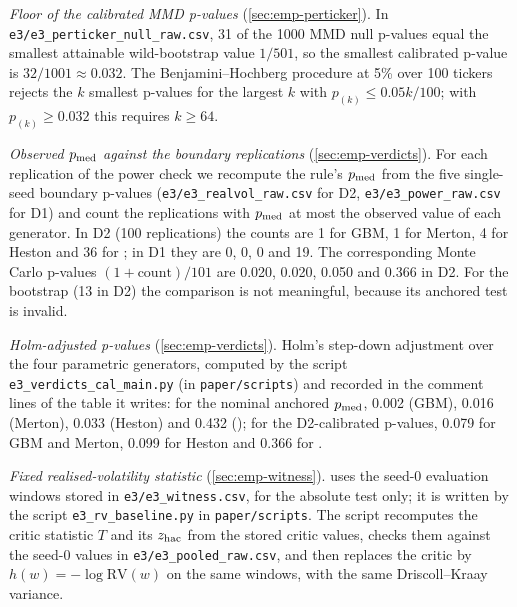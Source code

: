 \emph{Floor of the calibrated MMD p-values} (\cref{sec:emp-perticker}). In
\texttt{e3/e3\_perticker\_null\_raw.csv}, 31 of the 1000 MMD null p-values equal the smallest
attainable wild-bootstrap value $1/501$, so the smallest calibrated p-value is $32/1001\approx0.032$.
The Benjamini--Hochberg procedure at 5\% over 100 tickers rejects the $k$ smallest p-values for
the largest $k$ with $p_{(k)}\le0.05k/100$; with $p_{(k)}\ge0.032$ this requires $k\ge64$.

\emph{Observed $p_{\mathrm{med}}$ against the boundary replications} (\cref{sec:emp-verdicts}). For each
replication of the power check we recompute the rule's $p_{\mathrm{med}}$ from the five single-seed
boundary p-values (\texttt{e3/e3\_realvol\_raw.csv} for D2, \texttt{e3/e3\_power\_raw.csv} for D1)
and count the replications with $p_{\mathrm{med}}$ at most the observed value of each generator. In D2 (100
replications) the counts are 1 for GBM, 1 for Merton, 4 for Heston and 36 for \GARCHt{}; in D1 they
are 0, 0, 0 and 19. The corresponding Monte Carlo p-values $(1+\text{count})/101$ are 0.020,
0.020, 0.050 and 0.366 in D2. For the bootstrap (13 in D2) the comparison is not meaningful,
because its anchored test is invalid.

\emph{Holm-adjusted p-values} (\cref{sec:emp-verdicts}). Holm's step-down adjustment over the four
parametric generators, computed by the script \texttt{e3\_verdicts\_cal\_main.py} (in
\texttt{paper/scripts}) and recorded in the comment lines of the table it writes: for
the nominal anchored $p_{\mathrm{med}}$, 0.002 (GBM), 0.016 (Merton), 0.033 (Heston) and 0.432 (\GARCHt{});
for the D2-calibrated p-values, 0.079 for GBM and Merton, 0.099 for Heston and 0.366 for
\GARCHt{}.

\emph{Fixed realised-volatility statistic} (\cref{sec:emp-witness}). 
uses the seed-0 evaluation windows stored in \texttt{e3/e3\_witness.csv}, for the absolute test
only; it is written by the script \texttt{e3\_rv\_baseline.py} in \texttt{paper/scripts}. The
script recomputes the critic statistic $T$ and its $z_{\mathrm{hac}}$ from the stored critic values, checks
them against the seed-0 values in \texttt{e3/e3\_pooled\_raw.csv}, and then replaces the critic by
$h(w)=-\log\mathrm{RV}(w)$ on the same windows, with the same Driscoll--Kraay variance.

\begin{table}[tbp]
  \centering
  \caption{What the seed-0 \WC{} critics respond to (E3, $L=20$; 1500 real and 1500 synthetic
    evaluation windows per generator). $T$: the seed-0 statistic. Spearman correlations of the
    critic value with the window log realised volatility and with the largest absolute
    normalised return of the window, over the 3000 windows. Share of $T$ from realised
    volatility: the critic replaced by its mean within 20 equal-count bins of log realised
    volatility. Median realised volatility (root mean square of the normalised returns of a
    window; 1 = \TRAIN{} standard deviation of the ticker) of the real and synthetic evaluation
    windows. Derived from \texttt{results/e3/e3\_witness.csv}.}
  \label{tab:e3-witness-app}
  \small
\end{table}
